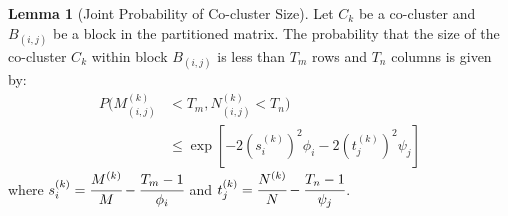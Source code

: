 \documentclass[journal]{IEEEtran}
\theoremstyle{definition}
\newtheorem{lemma}[theorem]{Lemma}
\theoremstyle{remark} %
\begin{document}
\begin{lemma}[Joint Probability of Co-cluster Size]
    \label{thm:joint-probability}
    Let $C_k$ be a co-cluster and $B_{(i,j)}$ be a block in the partitioned matrix. The probability that the size of the co-cluster $C_k$ within block $B_{(i,j)}$ is less than $T_m$ rows and $T_n$ columns is given by:
    \begin{equation}
        \begin{aligned}
            P(M_{(i,j)}^{(k)} &< T_m, N_{(i,j)}^{(k)} < T_n) \\
            &\leq \exp\left[-2 (s_i^{(k)})^2 \phi_i -2 (t_j^{(k)})^2 \psi_j\right]
        \end{aligned}
        \label{eq:joint-probability}
    \end{equation}
    where $s_i^{(k)} = \cfrac{M^{(k)}}{M} - \cfrac{T_m-1}{\phi_i}$ and $t_j^{(k)} = \cfrac{N^{(k)}}{N} - \cfrac{T_n-1}{\psi_j}$.
\end{lemma}
\end{document}
